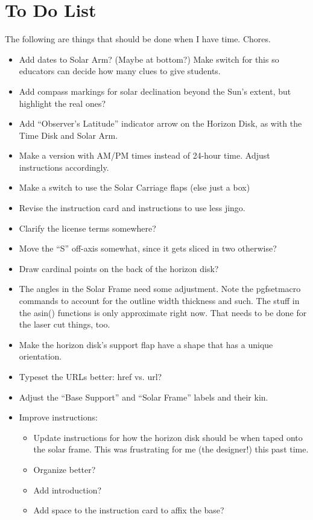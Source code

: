 \documentclass[tikz]{article}
\begin{document}
	\section*{To Do List}
	The following are things that should be done when I have time. Chores. 
	\begin{itemize}
		\item Add dates to Solar Arm? (Maybe at bottom?) Make switch for this so educators can decide how many clues to give students.
		\item Add compass markings for solar declination beyond the Sun's extent, but highlight the real ones?
		\item Add ``Observer's Latitude'' indicator arrow on the Horizon Disk, as with the Time Disk and Solar Arm. 
		\item Make a version with AM/PM times instead of 24-hour time. Adjust instructions accordingly. 
		\item Make a switch to use the Solar Carriage flaps (else just a box)
		\item Revise the instruction card and instructions to use less jingo. 
		\item Clarify the license terms somewhere?
		\item Move the ``S'' off-axis somewhat, since it gets sliced in two otherwise?
		\item Draw cardinal points on the back of the horizon disk? 
		\item The angles in the Solar Frame need some adjustment. Note the pgfsetmacro commands to account for the outline width thickness and such. The stuff in the asin() functions is only approximate right now. That needs to be done for the laser cut things, too. 
		\item Make the horizon disk's support flap have a shape that has a unique orientation. 
		\item Typeset the URLs better: href vs. url?
		\item Adjust the ``Base Support'' and ``Solar Frame'' labels and their kin. 
		\item Improve instructions:
		\begin{itemize}
			\item Update instructions for how the horizon disk should be when taped onto the solar frame. This was frustrating for me (the designer!) this past time. 
			\item Organize better? 
			\item Add introduction? 
			\item Add space to the instruction card to affix the base?
		\end{itemize}
	\end{itemize}
\end{document}
